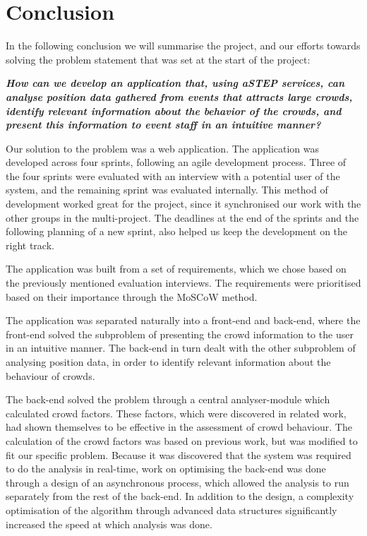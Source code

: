 \chapter{Conclusion}\label{ch:conclusion}


In the following conclusion we will summarise the project, and our efforts towards solving the problem statement that was set at the start of the project:

\vspace{0.5 cm}
\begin{center}
	\textbf{\textit{How can we develop an application that, using aSTEP services, can analyse position data gathered from events that attracts large crowds, identify relevant information about the behavior of the crowds, and present this information to event staff in an intuitive manner?}}
\end{center}

Our solution to the problem was a web application. The application was developed across four sprints, following an agile development process. Three of the four sprints were evaluated with an interview with a potential user of the system, and the remaining sprint was evaluated internally. This method of development worked great for the project, since it synchronised our work with the other groups in the multi-project. The deadlines at the end of the sprints and the following planning of a new sprint, also helped us keep the development on the right track.

The application was built from a set of requirements, which we chose based on the previously mentioned evaluation interviews. The requirements were prioritised based on their importance through the MoSCoW method.

The application was separated naturally into a front-end and back-end, where the front-end solved the subproblem of presenting the crowd information to the user in an intuitive manner. The back-end in turn dealt with the other subproblem of analysing position data, in order to identify relevant information about the behaviour of crowds.

The back-end solved the problem through a central analyser-module which calculated crowd factors. These factors, which were discovered in related work, had shown themselves to be effective in the assessment of crowd behaviour. The calculation of the crowd factors was based on previous work, but was modified to fit our specific problem. Because it was discovered that the system was required to do the analysis in real-time, work on optimising the back-end was done through a design of an asynchronous process, which allowed the analysis to run separately from the rest of the back-end. In addition to the design, a complexity optimisation of the algorithm through advanced data structures significantly increased the speed at which analysis was done.

